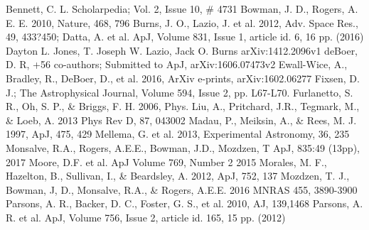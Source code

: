 \documentclass[12pt]{amsart}
\begin{document}
\singlespace
\begin{thebibliography}{}
Bennett, C. L. Scholarpedia; Vol. 2, Issue 10, \# 4731
Bowman, J. D.,  Rogers, A. E. E. 2010, Nature, 468, 796
Burns, J. O., Lazio, J. et al. 2012,  Adv. Space Res., 49, 433?450;
Datta, A. et al. ApJ, Volume 831, Issue 1, article id. 6, 16 pp. (2016)
Dayton L. Jones, T. Joseph W. Lazio, Jack O. Burns
 arXiv:1412.2096v1
deBoer, D. R, +56 co-authors; Submitted to ApJ, arXiv:1606.07473v2
Ewall-Wice, A., Bradley, R., DeBoer, D., et al. 2016, ArXiv e-prints, arXiv:1602.06277
Fixsen, D. J.; The Astrophysical Journal, Volume 594, Issue 2, pp. L67-L70.
Furlanetto, S. R., Oh, S. P., \& Briggs, F. H. 2006, Phys.
Liu, A., Pritchard, J.R., Tegmark, M., \& Loeb, A. 2013
Phys Rev D, 87, 043002
Madau, P., Meiksin, A., \& Rees, M. J. 1997, ApJ, 475, 429
Mellema, G. et al. 2013,
Experimental Astronomy, 36, 235
Monsalve, R.A., Rogers, A.E.E., Bowman, J.D., Mozdzen, T 
 ApJ, 835:49 (13pp), 2017 
 Moore, D.F. et al. ApJ Volume 769, Number 2 2015
Morales, M. F., Hazelton, B., Sullivan, I., \& Beardsley, A. 2012,
ApJ, 752, 137
Mozdzen, T. J., Bowman, J, D., Monsalve, R.A., \& Rogers, A.E.E. 2016
MNRAS 455, 3890-3900
Parsons, A. R., Backer, D. C., Foster, G. S., et al. 2010, AJ, 139,1468
Parsons, A. R. et al. ApJ, Volume 756, Issue 2, article id. 165, 15 pp. (2012)

\end{thebibliography}
\end{document}
